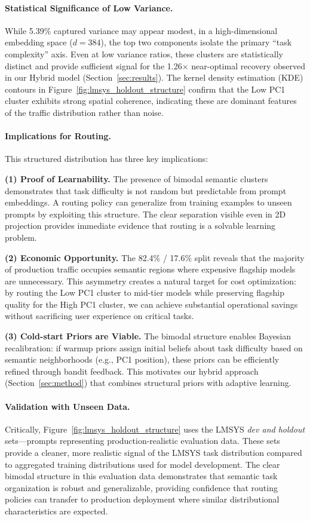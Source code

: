 \paragraph{Statistical Significance of Low Variance.} While 5.39\% captured variance may appear modest, 
in a high-dimensional embedding space ($d=384$), the top two components isolate the primary ``task complexity'' 
axis. Even at low variance ratios, these clusters are statistically distinct and provide sufficient signal 
for the 1.26$\times$ near-optimal recovery observed in our Hybrid model (Section~\ref{sec:results}). 
The kernel density estimation (KDE) contours in Figure~\ref{fig:lmsys_holdout_structure} confirm that 
the Low PC1 cluster exhibits strong spatial coherence, indicating these are dominant features of the 
traffic distribution rather than noise.

\paragraph{Implications for Routing.} This structured distribution has three key implications:

\textbf{(1) Proof of Learnability.} The presence of bimodal semantic clusters demonstrates that task 
difficulty is not random but predictable from prompt embeddings. A routing policy can generalize from 
training examples to unseen prompts by exploiting this structure. The clear separation visible even 
in 2D projection provides immediate evidence that routing is a solvable learning problem.

\textbf{(2) Economic Opportunity.} The 82.4\% / 17.6\% split reveals that the majority of production 
traffic occupies semantic regions where expensive flagship models are unnecessary. This asymmetry 
creates a natural target for cost optimization: by routing the Low PC1 cluster to mid-tier models 
while preserving flagship quality for the High PC1 cluster, we can achieve substantial operational 
savings without sacrificing user experience on critical tasks.

\textbf{(3) Cold-start Priors are Viable.} The bimodal structure enables Bayesian recalibration: 
if warmup priors assign initial beliefs about task difficulty based on semantic neighborhoods (e.g., 
PC1 position), these priors can be efficiently refined through bandit feedback. This motivates our 
hybrid approach (Section~\ref{sec:method}) that combines structural priors with adaptive learning.

\paragraph{Validation with Unseen Data.} Critically, Figure~\ref{fig:lmsys_holdout_structure} uses 
the LMSYS \emph{dev and holdout} sets---prompts representing production-realistic evaluation data. 
These sets provide a cleaner, more realistic signal of the LMSYS task distribution compared to 
aggregated training distributions used for model development. The clear bimodal structure in this 
evaluation data demonstrates that semantic task organization is robust and generalizable, providing 
confidence that routing policies can transfer to production deployment where similar distributional 
characteristics are expected.

